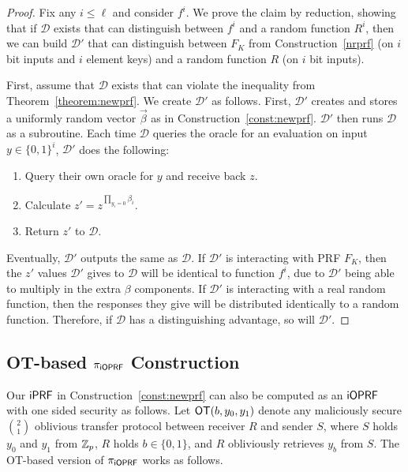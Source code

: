 \begin{proof}
Fix any $i\leq\ell$ and consider $f^i$.  We prove the claim by
reduction, showing that if $\mathcal{D}$ exists that can distinguish
between $f^i$ and a random function $R^i$, then we can build
$\mathcal{D}'$ that can distinguish between $F_K$ from
Construction~\ref{nrprf} (on $i$ bit inputs and $i$ element keys) and a
random function $R$ (on $i$ bit inputs).

First, assume that $\mathcal{D}$ exists that can violate the
inequality from Theorem~\ref{theorem:newprf}.  We create
$\mathcal{D'}$ as follows.  First, $\mathcal{D}'$ creates and stores a
uniformly random vector $\vec{\beta}$ as in
Construction~\ref{const:newprf}.  $\mathcal{D}'$ then runs
$\mathcal{D}$ as a subroutine.  Each time $\mathcal{D}$ queries the
oracle for an evaluation on input $y\in\{0,1\}^i$, $\mathcal{D}'$ does the
following:

\begin{enumerate}
\item Query their own oracle for $y$ and receive back $z$.
\item Calculate $z' = z^{\prod_{y_i = 0} \beta_i}$.
\item Return $z'$ to $\mathcal{D}$.
\end{enumerate}

Eventually, $\mathcal{D}'$ outputs the same as $\mathcal{D}$.  If
$\mathcal{D}'$ is interacting with PRF $F_K$, then the $z'$ values
$\mathcal{D}'$ gives to $\mathcal{D}$ will be identical to function
$f^i$, due to $\mathcal{D}'$ being able to multiply in the extra
$\beta$ components.  If $\mathcal{D}'$ is interacting with a real
random function, then the responses they give will be distributed
identically to a random function.   Therefore, if $\mathcal{D}$ has a
distinguishing advantage, so will $\mathcal{D}'$.
\end{proof}





\subsection{OT-based ${\pi_{\mathsf{i}\mathsf{OPRF}}}$ Construction}
Our $\mathsf{i}\mathsf{PRF}$ in Construction~\ref{const:newprf} can also be computed as
an $\mathsf{i}\mathsf{OPRF}$ with one sided security as follows.  Let $\mathsf{OT}(b, y_0,
y_1)$ denote any maliciously secure $\binom{2}{1}$ oblivious transfer
protocol between receiver $R$ and sender $S$, where $S$ holds $y_0$
and $y_1$ from $\mathbb{Z}_p$, $R$ holds $b\in\{0,1\}$, and $R$ obliviously
retrieves $y_b$ from $S$.  The OT-based version of ${\pi_{\mathsf{i}\mathsf{OPRF}}}$ works as
follows.

